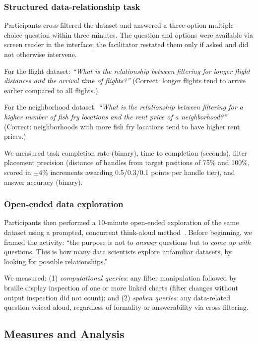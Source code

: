 \documentclass[12pt]{cmuthesis}
\begin{document}
\subsubsection{Structured data-relationship task}

Participants cross-filtered the dataset and answered a three-option multiple-choice question within three minutes. The question and options were available via screen reader in the interface; the facilitator restated them only if asked and did not otherwise intervene.

For the flight dataset: \textit{``What is the relationship between filtering for longer flight distances and the arrival time of flights?''} (Correct: longer flights tend to arrive earlier compared to all flights.)

For the neighborhood dataset: \textit{``What is the relationship between filtering for a higher number of fish fry locations and the rent price of a neighborhood?''} (Correct: neighborhoods with more fish fry locations tend to have higher rent prices.)

We measured task completion rate (binary), time to completion (seconds), filter placement precision (distance of handles from target positions of 75\% and 100\%, scored in $\pm$4\% increments awarding 0.5/0.3/0.1 points per handle tier), and answer accuracy (binary).

\subsubsection{Open-ended data exploration}

Participants then performed a 10-minute open-ended exploration of the same dataset using a prompted, concurrent think-aloud method~\cite{Alhadreti2018}. Before beginning, we framed the activity: ``the purpose is not to \textit{answer} questions but to \textit{come up with} questions. This is how many data scientists explore unfamiliar datasets, by looking for possible relationships.''

We measured: (1) \textit{computational queries}: any filter manipulation followed by braille display inspection of one or more linked charts (filter changes without output inspection did not count); and (2) \textit{spoken queries}: any data-related question voiced aloud, regardless of formality or answerability via cross-filtering.

 
\subsection{Measures and Analysis} 
\end{document}
